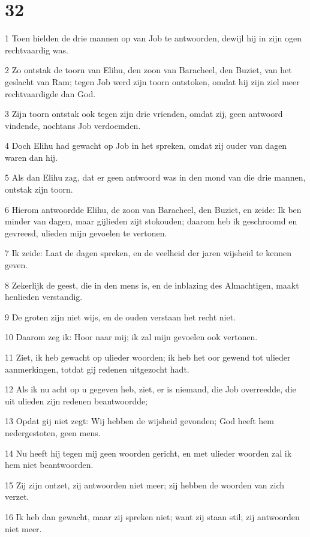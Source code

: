 \chapter{32}

\par 1 Toen hielden de drie mannen op van Job te antwoorden, dewijl hij in zijn ogen rechtvaardig was.
\par 2 Zo ontstak de toorn van Elihu, den zoon van Baracheel, den Buziet, van het geslacht van Ram; tegen Job werd zijn toorn ontstoken, omdat hij zijn ziel meer rechtvaardigde dan God.
\par 3 Zijn toorn ontstak ook tegen zijn drie vrienden, omdat zij, geen antwoord vindende, nochtans Job verdoemden.
\par 4 Doch Elihu had gewacht op Job in het spreken, omdat zij ouder van dagen waren dan hij.
\par 5 Als dan Elihu zag, dat er geen antwoord was in den mond van die drie mannen, ontstak zijn toorn.
\par 6 Hierom antwoordde Elihu, de zoon van Baracheel, den Buziet, en zeide: Ik ben minder van dagen, maar gijlieden zijt stokouden; daarom heb ik geschroomd en gevreesd, ulieden mijn gevoelen te vertonen.
\par 7 Ik zeide: Laat de dagen spreken, en de veelheid der jaren wijsheid te kennen geven.
\par 8 Zekerlijk de geest, die in den mens is, en de inblazing des Almachtigen, maakt henlieden verstandig.
\par 9 De groten zijn niet wijs, en de ouden verstaan het recht niet.
\par 10 Daarom zeg ik: Hoor naar mij; ik zal mijn gevoelen ook vertonen.
\par 11 Ziet, ik heb gewacht op ulieder woorden; ik heb het oor gewend tot ulieder aanmerkingen, totdat gij redenen uitgezocht hadt.
\par 12 Als ik nu acht op u gegeven heb, ziet, er is niemand, die Job overreedde, die uit ulieden zijn redenen beantwoordde;
\par 13 Opdat gij niet zegt: Wij hebben de wijsheid gevonden; God heeft hem nedergestoten, geen mens.
\par 14 Nu heeft hij tegen mij geen woorden gericht, en met ulieder woorden zal ik hem niet beantwoorden.
\par 15 Zij zijn ontzet, zij antwoorden niet meer; zij hebben de woorden van zich verzet.
\par 16 Ik heb dan gewacht, maar zij spreken niet; want zij staan stil; zij antwoorden niet meer.
